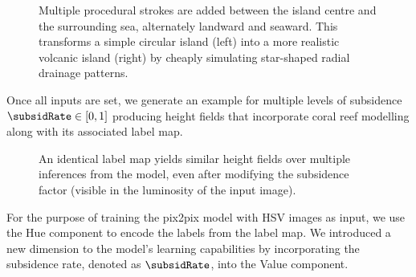 \begin{figure}[tb]
    \caption[Radial drainage inserted in our dataset generation]{Multiple procedural strokes are added between the island centre and the surrounding sea, alternately landward and seaward. This transforms a simple circular island (left) into a more realistic volcanic island (right) by cheaply simulating star-shaped radial drainage patterns.}
    \label{fig:coral-island-radial-pattern-example}
\end{figure}

Once all inputs are set, we generate an example for multiple levels of subsidence $\subsidRate \in [0, 1]$ producing height fields that incorporate coral reef modelling along with its associated label map.

\begin{figure}[tb]
    \caption[Multiple islands generated with two subsidence values]{An identical label map yields similar height fields over multiple inferences from the model, even after modifying the subsidence factor (visible in the luminosity of the input image).}
    \label{fig:coral-island-results-subsidence}
\end{figure}


For the purpose of training the pix2pix model with HSV images as input, we use the Hue component to encode the labels from the label map. We introduced a new dimension to the model's learning capabilities by incorporating the subsidence rate, denoted as $\subsidRate$, into the Value component.

